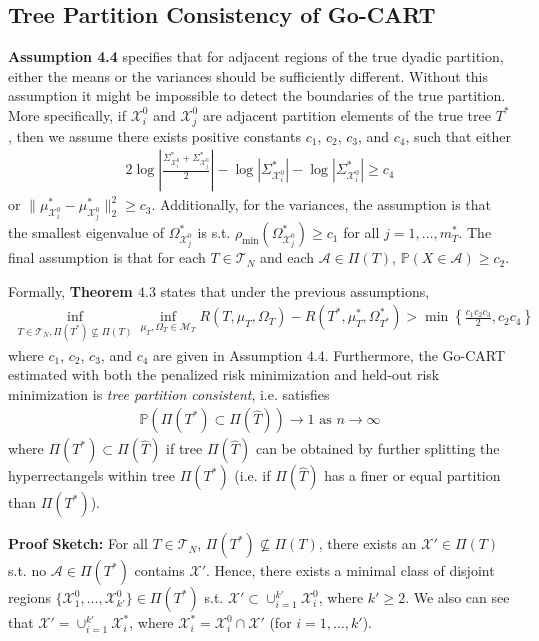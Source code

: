 \subsection{Tree Partition Consistency of Go-CART}

\textbf{Assumption 4.4} specifies that for adjacent regions of the true dyadic partition, either the means or the variances should be sufficiently different. Without this assumption it might be impossible to detect the boundaries of the true partition. More specifically, if $\mathcal{X}_i^0$ and $\mathcal{X}_j^0$ are adjacent partition elements of the true tree $T^*$, then we assume there exists positive constants $c_1$, $c_2$, $c_3$, and $c_4$, such that either
\begin{align}
    2 \log \left| \frac{\Sigma_{\mathcal{X}_i^0}^* + \Sigma_{\mathcal{X}_j^0}^*}{2}  \right| - \log \left| \Sigma_{\mathcal{X}_i^0}^*  \right| - \log \left| \Sigma_{\mathcal{X}_i^0}^*  \right| \geq c_4
\end{align}
or $\| \mu_{\mathcal{X}_i^0}^* - \mu_{\mathcal{X}_j^0}^* \|_2^2 \geq c_3$. Additionally, for the variances, the assumption is that the smallest eigenvalue of $\Omega_{\mathcal{X}_j^0}^*$ is s.t. $\rho_{\text{min}}(\Omega_{\mathcal{X}_j^0}^*) \geq c_1$ for all $j=1,\ldots,m_T^*$. The final assumption is that for each $T \in \mathcal{T}_N$ and each $\mathcal{A} \in \Pi(T)$, $\mathbb{P}(X\in \mathcal{A}) \geq c_2$.


Formally, \textbf{Theorem $4.3$} states that under the previous assumptions, 
\begin{align}
    \inf_{T \in \mathcal{T}_N, \Pi(T^*) \nsubseteq \Pi(T)}
    \inf_{\mu_T, \Omega_T \in \mathcal{M}_T }
    R(T,\mu_T,\Omega_T) - R(T^*,\mu_T^*,\Omega_{T^*}^*) > \min \left\{ \frac{c_1 c_2 c_3}{2}, c_2 c_4  \right\}
\end{align}
where $c_1$, $c_2$, $c_3$, and $c_4$ are given in Assumption $4.4$. Furthermore, the Go-CART estimated with both the penalized risk minimization and held-out risk minimization is \emph{tree partition consistent}, i.e. satisfies
\begin{align}
    \mathbb{P}\left( \Pi(T^*) \subset \Pi(\hat{T}) \right) \rightarrow 1 \text{ as } n\rightarrow \infty
\end{align}
where $\Pi(T^*) \subset \Pi(\hat{T})$ if tree $\Pi(\hat{T})$ can be obtained by further splitting the hyperrectangels within tree $\Pi(T^*)$ (i.e. if $\Pi(\hat{T})$ has a finer or equal partition than $\Pi(T^*)$).


\textbf{Proof Sketch:} For all $T \in \mathcal{T}_N$, $\Pi(T^*) \nsubseteq \Pi(T)$, there exists an $\mathcal{X}' \in \Pi(T)$ s.t. no $\mathcal{A} \in \Pi(T^*)$ contains $\mathcal{X}'$. Hence, there exists a minimal class of disjoint regions $\{ \mathcal{X}_1^0,\ldots,\mathcal{X}_{k'}^0 \} \in \Pi(T^*)$ s.t. $\mathcal{X}' \subset \cup_{i=1}^{k'} \mathcal{X}_i^0$, where $k' \geq 2$. We also can see that $\mathcal{X}' = \cup_{i=1}^{k'} \mathcal{X}_i^*$, where $\mathcal{X}_i^* = \mathcal{X}_i^0 \cap \mathcal{X}'$ (for $i=1,\ldots,k'$).

